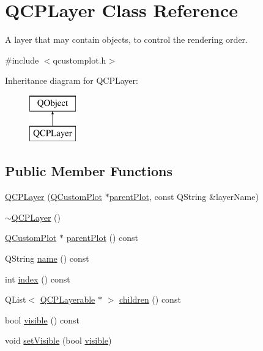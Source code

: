 \hypertarget{class_q_c_p_layer}{}\section{Q\+C\+P\+Layer Class Reference}
\label{class_q_c_p_layer}


A layer that may contain objects, to control the rendering order.  




{\ttfamily \#include $<$qcustomplot.\+h$>$}

Inheritance diagram for Q\+C\+P\+Layer\+:\begin{figure}[H]
\begin{center}
\leavevmode
\includegraphics[height=2.000000cm]{class_q_c_p_layer}
\end{center}
\end{figure}
\subsection*{Public Member Functions}
\begin{DoxyCompactItemize}
\item 
\hyperlink{class_q_c_p_layer_a5d0657fc86d624e5efbe930ef21af718}{Q\+C\+P\+Layer} (\hyperlink{class_q_custom_plot}{Q\+Custom\+Plot} $\ast$\hyperlink{class_q_c_p_layer_a3958c9a938c2d05a7378c41484acee08}{parent\+Plot}, const Q\+String \&layer\+Name)
\item 
\hyperlink{class_q_c_p_layer_afc1a8940f8e34c9f25ead9dfd4828cae}{$\sim$\+Q\+C\+P\+Layer} ()
\item 
\hyperlink{class_q_custom_plot}{Q\+Custom\+Plot} $\ast$ \hyperlink{class_q_c_p_layer_a3958c9a938c2d05a7378c41484acee08}{parent\+Plot} () const 
\item 
Q\+String \hyperlink{class_q_c_p_layer_a96ebd1e436f3813938cb9cd4a59a60be}{name} () const 
\item 
int \hyperlink{class_q_c_p_layer_ad5d7010829a6b99f326b07d7e37c8c99}{index} () const 
\item 
Q\+List$<$ \hyperlink{class_q_c_p_layerable}{Q\+C\+P\+Layerable} $\ast$ $>$ \hyperlink{class_q_c_p_layer_a94c2f0100e48cefad2de8fe0fbb03c27}{children} () const 
\item 
bool \hyperlink{class_q_c_p_layer_a9efca636e4dcad721999a6282f296016}{visible} () const 
\item 
void \hyperlink{class_q_c_p_layer_ac07671f74edf6884b51a82afb2c19516}{set\+Visible} (bool \hyperlink{class_q_c_p_layer_a9efca636e4dcad721999a6282f296016}{visible})
\end{DoxyCompactItemize}
